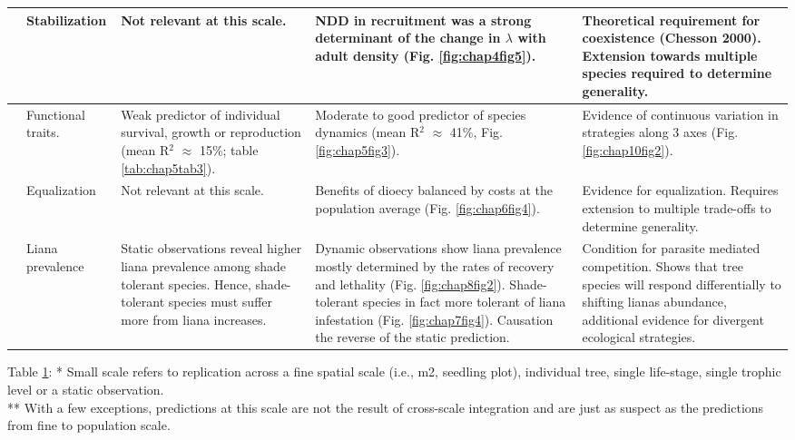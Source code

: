 \documentclass[b5paper,justified]{tufte-book} %
\begin{document}
\begin{landscape}
\begin{table}
\begin{center}
\begin{tabular}{p{1cm} p{2.5cm} p{5cm} p{5cm} p{5cm}}
& Stabilization
& Not relevant at this scale.
& NDD in recruitment was a strong determinant of the change in $\lambda$ with adult density (Fig. \ref{fig:chap4fig5}).	
& Theoretical requirement for coexistence (Chesson 2000). Extension towards multiple species required to determine generality.\\
\hline 

\parbox[t]{2mm}{} 
& Functional traits.	
& Weak predictor of individual survival, growth or reproduction (mean R$^2$ $\approx$ 15\%; table \ref{tab:chap5tab3}). \vspace{0.3cm}
& Moderate to good predictor of species dynamics (mean R$^2$ $\approx$ 41\%, Fig. \ref{fig:chap5fig3}).\vspace{0.3cm}	
& Evidence of continuous variation in strategies along 3 axes (Fig. \ref{fig:chap10fig2}).  \\

& Equalization
& Not relevant at this scale. 
& Benefits of dioecy balanced by costs at the population average (Fig. \ref{fig:chap6fig4}). 
& Evidence for equalization. Requires extension to multiple trade-offs to determine generality. \vspace{0.3cm}  \\

& Liana prevalence  
& Static observations reveal higher liana prevalence among shade tolerant species. Hence, shade-tolerant species must suffer more from liana increases. 
& Dynamic observations show liana prevalence mostly determined by the rates of recovery and lethality (Fig. \ref{fig:chap8fig2}). Shade-tolerant species in fact more tolerant of liana infestation (Fig. \ref{fig:chap7fig4}). Causation the reverse of the static prediction.	
& Condition for parasite mediated competition. Shows that tree species will respond differentially to shifting lianas abundance, additional evidence for divergent ecological strategies. \vspace{0.4cm} \\

 
 \hline
 \end{tabular}
\label{tab:chap10tab1}
 \hspace*{4cm}\begin{minipage}{20cm}
 Table \ref{tab:chap10tab1}: 
* Small scale refers to replication across a fine spatial scale (i.e., m2, seedling plot), individual tree, single life-stage, single trophic level or a static observation. \\
** With a few exceptions, predictions at this scale are not the result of cross-scale integration and are just as suspect as the predictions from fine to population scale.  
\end{minipage}
\end{center}
\end{table}
\end{landscape}
\end{document}
